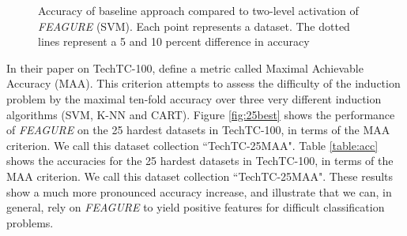 \documentclass[twoside,11pt]{article}
\theoremstyle{definition}
\begin{document}
\begin{figure}
\begin{minipage}{0.45\textwidth}
		\caption{Accuracy of
			baseline approach compared to two-level activation of \emph{FEAGURE} (SVM). Each point represents a dataset. The dotted lines represent a 5 and 10 percent difference in accuracy}
		\label{fig:svm_base_lvl2}
	\end{minipage}
\end{figure}


In their paper on TechTC-100, \cite{gabrilovich2004text} define a metric called Maximal Achievable Accuracy (MAA). This criterion attempts to assess the difficulty of the induction problem by the maximal ten-fold accuracy over three very different induction algorithms (SVM, K-NN and CART).
Figure \ref{fig:25best} shows the performance of \emph{FEAGURE} on the 25 hardest datasets in TechTC-100, in terms of the MAA criterion. We call this dataset collection ``TechTC-25MAA". 
Table \ref{table:acc} shows the accuracies for the 25 hardest datasets in TechTC-100, in terms of the MAA criterion. We call this dataset collection ``TechTC-25MAA". 
These results show a much more pronounced accuracy increase, and illustrate that we can, in general, rely on \emph{FEAGURE} to yield positive features for difficult classification problems.
\end{document}
